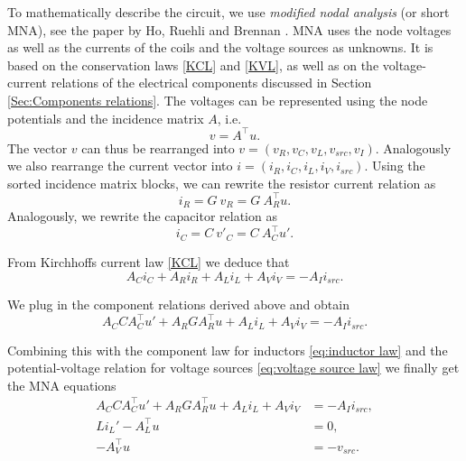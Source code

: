 To mathematically describe the circuit, we use \emph{modified nodal analysis} (or short MNA), see the paper by Ho, Ruehli and Brennan \cite{MNA75}. MNA uses the node voltages as well as the currents of the coils and the voltage sources as unknowns. It is based on the conservation laws \eqref{KCL} and \eqref{KVL}, as well as on the voltage-current relations of the electrical components discussed in Section \ref{Sec:Components relations}. The voltages can be represented using the node potentials and the incidence matrix $A$, i.e.
\begin{displaymath}
	v = A^\top u.
\end{displaymath}
The vector $v$ can thus be rearranged into $v = (v_R, v_C, v_L, v_{src}, v_I)$. Analogously we also rearrange the current vector into $i = (i_R, i_C, i_L, i_V, i_{src})$. Using the sorted incidence matrix blocks, we can rewrite the resistor current relation as
	\begin{displaymath}
		i_R = G \ v_R = G \ A_R^\top u.
	\end{displaymath}
Analogously, we rewrite the capacitor relation as
	\begin{displaymath}
		i_C = C \ v'_C = C \ A_C^\top u'.
	\end{displaymath}

From Kirchhoffs current law \eqref{KCL} we deduce that
\begin{displaymath}
	A_C i_C + A_R i_R + A_L i_L + A_V i_V = -A_I i_{src}.
\end{displaymath}

We plug in the component relations derived above and obtain
\begin{displaymath}
	A_C C A_C^\top u' + A_R G A_R^\top u + A_L i_L + A_V i_V = -A_I i_{src}.
 \end{displaymath}

Combining this with the component law for inductors \eqref{eq:inductor law} and the potential-voltage relation for voltage sources \eqref{eq:voltage source law} we finally get the MNA equations
\begin{displaymath}
	\begin{aligned}
		A_C C A_C^\top u' + A_R G A_R^\top u + A_L i_L + A_V i_V &= - A_I i_{src} , \\
		L i_L'	- A_L^\top u &= 0 , \\
		-A_V^\top u &=  -v_{src}.
	\end{aligned}	
\end{displaymath}

